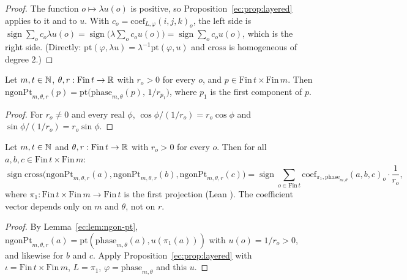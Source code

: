 \begin{proof}
The function $o\mapsto\lambda u(o)$ is positive, so Proposition~\ref{ec:prop:layered} applies to it and to $u$. With
$c_o=\mathrm{coef}_{L,\varphi}(i,j,k)_o$, the left side is
$\operatorname{sign}\sum_oc_o\lambda u(o)=\operatorname{sign}\bigl(\lambda\sum_oc_ou(o)\bigr)=\operatorname{sign}\sum_oc_ou(o)$,
which is the right side. (Directly: $\mathrm{pt}(\varphi,\lambda u)=\lambda^{-1}\mathrm{pt}(\varphi,u)$ and
$\mathrm{cross}$ is homogeneous of degree $2$.)
\end{proof}

\begin{lemma}\label{ec:lem:ngon-pt}
Let $m,t\in\mathbb N$, $\theta,r:\mathrm{Fin}\,t\to\mathbb R$ with $r_o>0$ for every $o$, and $p\in\mathrm{Fin}\,t\times\mathrm{Fin}\,m$.
Then $\mathrm{ngonPt}_{m,\theta,r}(p)=\mathrm{pt}\bigl(\mathrm{phase}_{m,\theta}(p),\,1/r_{p_1}\bigr)$, where $p_1$ is
the first component of $p$.
\end{lemma}

\begin{proof}
For $r_o\ne0$ and every real $\phi$, $\cos\phi/(1/r_o)=r_o\cos\phi$ and $\sin\phi/(1/r_o)=r_o\sin\phi$.
\end{proof}

\begin{theorem}\label{ec:thm:nested}
Let $m,t\in\mathbb N$ and $\theta,r:\mathrm{Fin}\,t\to\mathbb R$ with $r_o>0$ for every $o$. Then for all
$a,b,c\in\mathrm{Fin}\,t\times\mathrm{Fin}\,m$:
\begin{equation*}
\operatorname{sign}\mathrm{cross}\bigl(\mathrm{ngonPt}_{m,\theta,r}(a),\mathrm{ngonPt}_{m,\theta,r}(b),\mathrm{ngonPt}_{m,\theta,r}(c)\bigr)
=\operatorname{sign}\sum_{o\in\mathrm{Fin}\,t}\mathrm{coef}_{\pi_1,\mathrm{phase}_{m,\theta}}(a,b,c)_o\cdot\frac1{r_o},
\end{equation*}
where $\pi_1:\mathrm{Fin}\,t\times\mathrm{Fin}\,m\to\mathrm{Fin}\,t$ is the first projection \textup{(}Lean
\textup{)}. The coefficient vector depends only on $m$ and $\theta$, not on $r$.
\end{theorem}

\begin{proof}
By Lemma~\ref{ec:lem:ngon-pt}, $\mathrm{ngonPt}_{m,\theta,r}(a)=\mathrm{pt}(\mathrm{phase}_{m,\theta}(a),u(\pi_1(a)))$
with $u(o)=1/r_o>0$, and likewise for $b$ and $c$. Apply Proposition~\ref{ec:prop:layered} with
$\iota=\mathrm{Fin}\,t\times\mathrm{Fin}\,m$, $L=\pi_1$, $\varphi=\mathrm{phase}_{m,\theta}$ and this $u$.
\end{proof}

